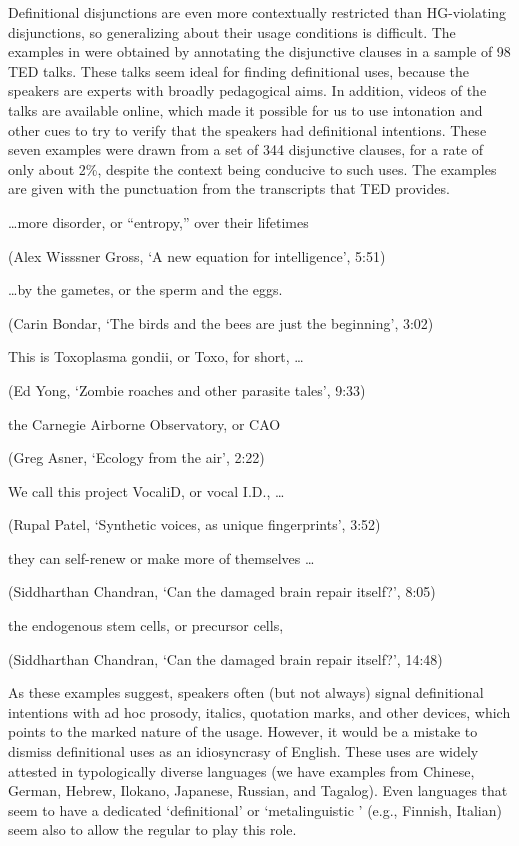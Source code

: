 \documentclass[12pt,twoside]{article}
\renewcommand{\_}{\textbf{\textunderscore\hspace{-4pt}\textunderscore\hspace{-3pt}\textunderscore\hspace{-4pt}\textunderscore}\hspace{0.5pt}}			%
\begin{document}
Definitional disjunctions are even more contextually restricted than
HG-violating disjunctions, so generalizing about their usage
conditions is difficult.  The examples in  were obtained by
annotating the disjunctive clauses in a sample of 98 TED talks. These
talks seem ideal for finding definitional uses, because the speakers
are experts with broadly pedagogical aims. In addition, videos of the
talks are available online, which made it possible for us to use
intonation and other cues to try to verify that the speakers had
definitional intentions. These seven examples were drawn from a set of
344 disjunctive clauses, for a rate of only about 2\%, despite the
context being conducive to such uses. The examples are given with the
punctuation from the transcripts that TED provides.
%
\begin{exe}
  \ex\label{ted}
  \begin{xlist}
    \ex \ldots more disorder, or ``entropy,'' over their lifetimes 
    
    (Alex Wisssner Gross, `A new equation for intelligence', 5:51)

    \ex \ldots by the gametes, or the sperm and the eggs.

    (Carin Bondar, `The birds and the bees are just the beginning', 3:02)

    \ex This is Toxoplasma gondii, or Toxo, for short, \ldots

    (Ed Yong, `Zombie roaches and other parasite tales', 9:33)

    \ex the Carnegie Airborne Observatory, or CAO

    (Greg Asner, `Ecology from the air', 2:22)

    \ex We call this project VocaliD, or vocal I.D., \ldots

    (Rupal Patel, `Synthetic voices, as unique fingerprints', 3:52)

    \ex they can self-renew or make more of themselves \ldots

    (Siddharthan Chandran, `Can the damaged brain repair itself?', 8:05)

    \ex the endogenous stem cells, or precursor cells,

    (Siddharthan Chandran, `Can the damaged brain repair itself?', 14:48)
  \end{xlist}
\end{exe}

As these examples suggest, speakers often (but not always) signal
definitional intentions with ad hoc prosody, italics, quotation marks,
and other devices, which points to the marked nature of the
usage. However, it would be a mistake to dismiss definitional uses as
an idiosyncrasy of English. These uses are widely attested in
typologically diverse languages (we have examples from Chinese,
German, Hebrew, Ilokano, Japanese, Russian, and Tagalog). Even
languages that seem to have a dedicated `definitional' or
`metalinguistic ' (e.g., Finnish, Italian) seem also to allow
the regular  to play this role.
\end{document}
